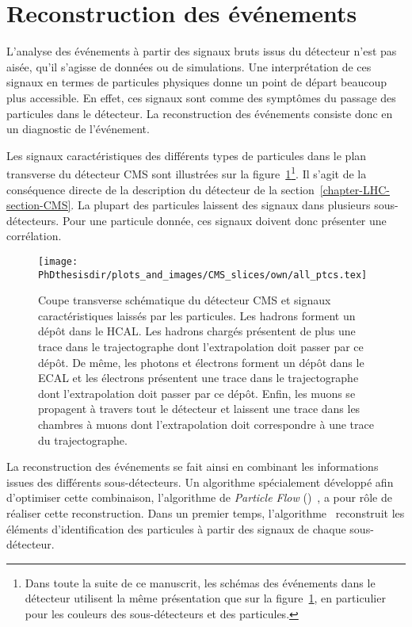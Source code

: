 \section{Reconstruction des événements}\label{chapter-LHC-section-evt_reco}
L'analyse des événements à partir des signaux bruts issus du détecteur n'est pas aisée, qu'il s'agisse de données ou de simulations.
Une interprétation de ces signaux en termes de particules physiques donne un point de départ beaucoup plus accessible.
En effet, ces signaux sont comme des \og symptômes \fg{} du passage des particules dans le détecteur.
La reconstruction des événements consiste donc en un \og diagnostic \fg{} de l'événement.
\par Les signaux caractéristiques des différents types de particules dans le plan transverse du détecteur CMS sont illustrées sur la figure~\ref{fig-chapter-LHC-section-evt_reco-cms_slice}\footnote{Dans toute la suite de ce manuscrit, les schémas des événements dans le détecteur utilisent la même présentation que sur la figure~\ref{fig-chapter-LHC-section-evt_reco-cms_slice}, en particulier pour les couleurs des sous-détecteurs et des particules.}.
Il s'agit de la conséquence directe de la description du détecteur de la section~\ref{chapter-LHC-section-CMS}.
La plupart des particules laissent des signaux dans plusieurs sous-détecteurs.
Pour une particule donnée, ces signaux doivent donc présenter une corrélation.
\begin{figure}[t]
\texttt{[image: \\PhDthesisdir/plots\_and\_images/CMS\_slices/own/all\_ptcs.tex]}
\caption[Coupe transverse schématique du détecteur CMS.]{Coupe transverse schématique du détecteur CMS et signaux caractéristiques laissés par les particules. Les hadrons forment un dépôt dans le HCAL. Les hadrons chargés présentent de plus une trace dans le trajectographe dont l'extrapolation doit passer par ce dépôt. De même, les photons et électrons forment un dépôt dans le ECAL et les électrons présentent une trace dans le trajectographe dont l'extrapolation doit passer par ce dépôt. Enfin, les muons se propagent à travers tout le détecteur et laissent une trace dans les chambres à muons dont l'extrapolation doit correspondre à une trace du trajectographe.}
\label{fig-chapter-LHC-section-evt_reco-cms_slice}
\end{figure}
\par La reconstruction des événements se fait ainsi en combinant les informations issues des différents sous-détecteurs.
Un algorithme spécialement développé afin d'optimiser cette combinaison, l'algorithme de \emph{Particle Flow} (\PF)~\cite{particle-flow,Dordevic_particle_flow}, a pour rôle de réaliser cette reconstruction. Dans un premier temps, l'algorithme \PF\ reconstruit les éléments d'identification des particules à partir des signaux de chaque sous-détecteur.
